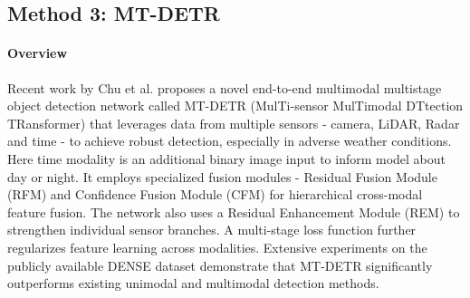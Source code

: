 \documentclass[report.tex]{subfiles}
\begin{document}
        

    
    \subsection{Method 3: MT-DETR}


    \paragraph*{Overview}
    
    Recent work by Chu et al. \cite{chu2023mt} proposes a novel end-to-end multimodal multistage object detection network called MT-DETR (MulTi-sensor MulTimodal DTtection TRansformer) that leverages data from multiple sensors - camera, LiDAR, Radar and time - to achieve robust detection, especially in adverse weather conditions. Here time modality is an additional binary image input to inform model about day or night. It employs specialized fusion modules - Residual Fusion Module (RFM) and Confidence Fusion Module (CFM) for hierarchical cross-modal feature fusion. The network also uses a Residual Enhancement Module (REM) to strengthen individual sensor branches. A multi-stage loss function further regularizes feature learning across modalities. Extensive experiments on the publicly available DENSE \cite{bijelic2020seeing} dataset demonstrate that MT-DETR significantly outperforms existing unimodal and multimodal detection methods.
\end{document}
